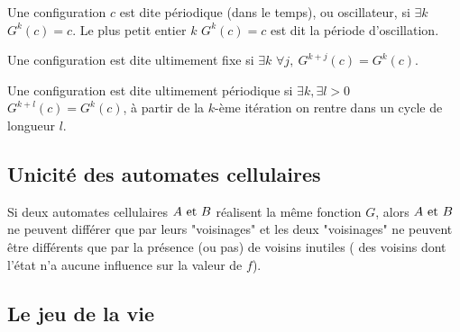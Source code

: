 \begin{definition}
	Une configuration $c$ est dite périodique (dans le temps), ou oscillateur, si $\exists k$ \tq $G^k(c) = c$. Le plus petit
	entier $k$ \tq $G^k(c) = c$ est dit la période d'oscillation.
\end{definition}

\begin{definition}
	Une configuration est dite ultimement fixe si $\exists k$ \tq $\forall j, \ G^{k+j}(c) =  G^{k}(c)$.
\end{definition}


\begin{definition}
	Une configuration est dite ultimement périodique si $\exists k, \exists l>0$ \tq $ G^{k+l}(c) =  G^{k}(c)$,
	\ie à partir de la $k$-ème itération on rentre dans un cycle de longueur $l$.
\end{definition}


\begin{exemple}
	\todo{~}
\end{exemple}


\subsection{Unicité des automates cellulaires}


\begin{theorem}
	Si deux automates cellulaires $A \text{ et } B$ réalisent la même fonction $G$, alors $A \text{ et } B$ ne peuvent différer que par
	leurs "voisinages" et les deux "voisinages" ne peuvent être différents que par la présence (ou pas) de voisins inutiles (\cad
	des voisins dont l'état n'a aucune influence sur la valeur de $f$).
\end{theorem}


\begin{exemple}
	\todo{~}
\end{exemple}

\subsection{Le jeu de la vie}

